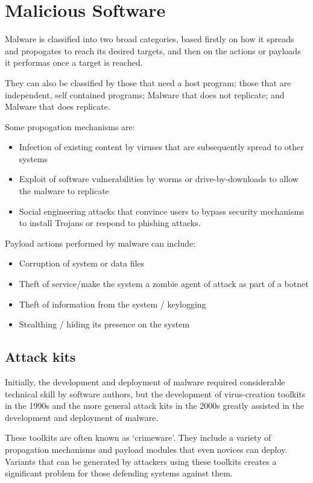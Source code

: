 \section{Malicious Software}
Malware is classified into two broad categories, based firstly on how it
spreads and propogates to reach its desired targets, and then on the actions
or payloads it performas once a target is reached.

They can also be classified by those that need a host program; those that
are independent, self contained programs; Malware that does not replicate;
and Malware that does replicate.

Some propogation mechanisms are:
\begin{itemize}
    \item Infection of existing content by viruses that are subsequently spread to other systems
    \item Exploit of software vulnerabilities by worms or drive-by-downloads to allow the malware to replicate
    \item Social engineering attacks that convince users to bypass security mechanisms to install Trojans or respond to phishing attacks.
\end{itemize}

Payload actions performed by malware can include:
\begin{itemize}
    \item Corruption of system or data files
    \item Theft of service/make the system a zombie agent of attack as part of a botnet
    \item Theft of information from the system / keylogging
    \item Stealthing / hiding its presence on the system
\end{itemize}

\subsection{Attack kits}
Initially, the development and deployment of malware required considerable technical skill
by software authors, but the development of virus-creation toolkits in the 1990s and the more general
attack kits in the 2000s greatly assisted in the development and deployment of malware.

These toolkits are often known as `crimeware'. They include a variety of propagation mechanisms and payload modules
that even novices can deploy. Variants that can be generated by attackers using these toolkits creates a significant
problem for those defending systems against them.

